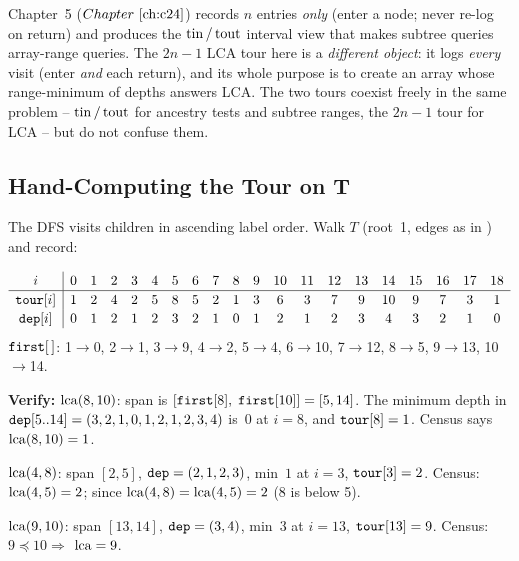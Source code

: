 \begin{insightbox}
Chapter~5 (\(\chref{c24}\)) records \(n\) entries \emph{only} (enter a
node; never re-log on return) and produces the \(\operatorname{tin}/\operatorname{tout}\) interval
view that makes subtree queries array-range queries.  The \(2n-1\) LCA
tour here is a \emph{different object}: it logs \emph{every} visit (enter
\emph{and} each return), and its whole purpose is to create an array
whose range-minimum of depths answers LCA.  The two tours coexist freely
in the same problem -- \(\operatorname{tin}/\operatorname{tout}\) for ancestry tests and subtree
ranges, the \(2n\!-\!1\) tour for LCA -- but do not confuse them.
\end{insightbox}

\subsection{Hand-Computing the Tour on T}

The DFS visits children in ascending label order.  Walk \(T\)
(root~1, edges as in ) and record:

\begin{tracebox}
\[
\renewcommand{\arraystretch}{1.15}
\begin{array}{c|ccccccccccccccccccc}
i & 0&1&2&3&4&5&6&7&8&9&10&11&12&13&14&15&16&17&18\\ \hline
\code{tour}[i] & 1&2&4&2&5&8&5&2&1&3&6&3&7&9&10&9&7&3&1\\
\code{dep}[i]  & 0&1&2&1&2&3&2&1&0&1&2&1&2&3&4&3&2&1&0
\end{array}
\]
\medskip
\(\texttt{first}[\,]\): 1\(\to\)0, 2\(\to\)1, 3\(\to\)9, 4\(\to\)2,
5\(\to\)4, 6\(\to\)10, 7\(\to\)12, 8\(\to\)5, 9\(\to\)13, 10\(\to\)14.

\medskip
\textbf{Verify:} \(\operatorname{lca}(8,10)\): span is \([\texttt{first}[8],\;\texttt{first}[10]]
= [5,14]\).  The minimum depth in \(\texttt{dep}[5..14] = (3,2,1,0,1,2,1,2,3,4)\)
is~\(0\) at \(i=8\), and \(\texttt{tour}[8] = 1\).  Census says
\(\operatorname{lca}(8,10) = 1\).  \checkmark

\(\operatorname{lca}(4,8)\): span \([2,5]\), \(\texttt{dep} = (2,1,2,3)\), min~\(1\) at
\(i=3\), \(\texttt{tour}[3]=2\).  Census: \(\operatorname{lca}(4,5)=2\); since
\(\operatorname{lca}(4,8)=\operatorname{lca}(4,5)=2\) (8 is below 5).  \checkmark

\(\operatorname{lca}(9,10)\): span \([13,14]\), \(\texttt{dep}=(3,4)\), min~\(3\) at
\(i=13\), \(\texttt{tour}[13]=9\).  Census: \(9 \preceq 10 \Rightarrow\)
\(\operatorname{lca}=9\).  \checkmark
\end{tracebox}

